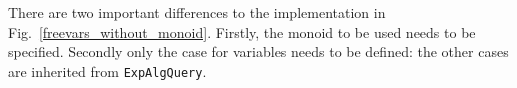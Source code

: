 There are two important differences to the implementation in
Fig.~\ref{freevars_without_monoid}.  Firstly, the monoid to be used
needs to be specified.  Secondly only the case for variables needs to
be defined: the other cases are inherited from
\lstinline{ExpAlgQuery}.

\begin{comment}
\haoyuan{Begin: client code.}
Now one can do some experiments with this approach. First comes an example of the expression built up like this:


The method \lstinline{genExp()} just gives the expression \lstinline{x + (y + 2)}. And then an instance of \lstinline{FreeVars} is passed to \lstinline{genExp()} to get the names of free variables.
The result given by the following code is \lstinline{[x, y]}, which is a set of strings.


\haoyuan{End: client code. x + (y + 2) and [x, y] in code style?}
\end{comment}



\begin{comment}
But the result for an expression can only be a null list based on the
monoid. Thus in the freeVars query, furthermore, we expect the
variables to store their names into a list, and by using the monoid,
freeVars can be implemented. See Fig.~\ref{freevars_with_monoid}.


When the interface \lstinline{FreeVarsExpAlg} is used, an object of
the \lstinline{FreeVarsMonoid} is then created. As we can see, it is
needless for a user to write an exclusive traversal fully for a data
structure. Nothing but a monoid is required together with a few
methods being overwritten. And furthermore, a monoid can usually be
shared among query algebras with the same data type.
\end{comment}

